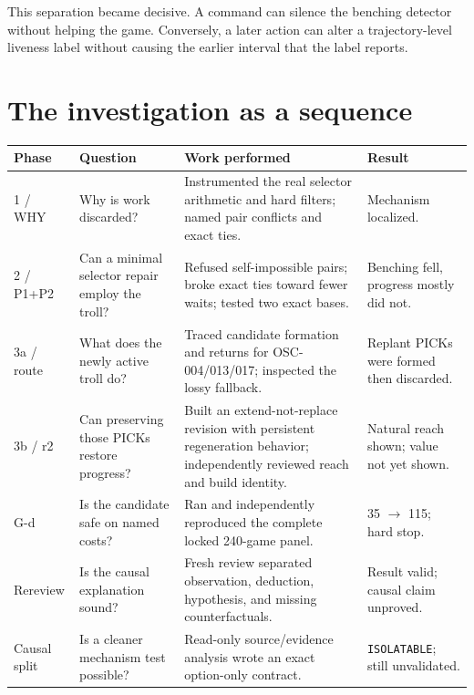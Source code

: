 \documentclass[10pt,a4paper]{article}
\newcommand{\code}[1]{\texttt{#1}}
\begin{document}
This separation became decisive. A command can silence the benching detector without helping the
game. Conversely, a later action can alter a trajectory-level liveness label without causing the
earlier interval that the label reports.

\section{The investigation as a sequence}

\begin{tabularx}{\textwidth}{@{}p{18mm}p{33mm}Y p{28mm}@{}}
\toprule
\textbf{Phase} & \textbf{Question} & \textbf{Work performed} & \textbf{Result} \\
 / WHY & Why is work discarded? & Instrumented the real selector arithmetic and hard filters; named pair conflicts and exact ties. & Mechanism localized. \\
2 / P1+P2 & Can a minimal selector repair employ the troll? & Refused self-impossible pairs; broke exact ties toward fewer waits; tested two exact bases. & Benching fell, progress mostly did not. \\
3a / route & What does the newly active troll do? & Traced candidate formation and returns for OSC-004/013/017; inspected the lossy fallback. & Replant PICKs were formed then discarded. \\
3b / r2 & Can preserving those PICKs restore progress? & Built an extend-not-replace revision with persistent regeneration behavior; independently reviewed reach and build identity. & Natural reach shown; value not yet shown. \\
G-d & Is the candidate safe on named costs? & Ran and independently reproduced the complete locked 240-game panel. & 35 $\rightarrow$ 115; hard stop. \\
Rereview & Is the causal explanation sound? & Fresh review separated observation, deduction, hypothesis, and missing counterfactuals. & Result valid; causal claim unproved. \\
Causal split & Is a cleaner mechanism test possible? & Read-only source/evidence analysis wrote an exact option-only contract. & \code{ISOLATABLE}; still unvalidated. \\
\bottomrule
\end{tabularx}
\end{document}
